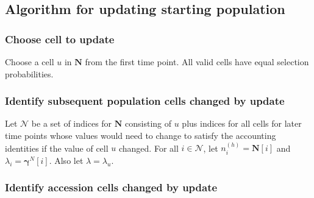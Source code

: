 \documentclass{article}
\begin{document}






\subsection{Algorithm  for updating starting population}


\subsubsection{Choose cell to update}

Choose a cell $u$ in $\bm{N}$ from the first time point.  All valid cells have equal selection probabilities.

\subsubsection{Identify subsequent population cells changed by update}

Let $\mathcal{N}$ be a set of indices for $\bm{N}$ consisting of $u$ plus indices for all cells for later time points whose values would need to change to satisfy the accounting identities if the value of cell $u$ changed. For all $i \in \mathcal{N}$, let $n_i^{(h)} = \bm{N}[i]$ and $\lambda_i = \bm{\gamma}^N[i]$.  Also let $\lambda = \lambda_u$.

\subsubsection{Identify accession cells changed by update}
\end{document}

